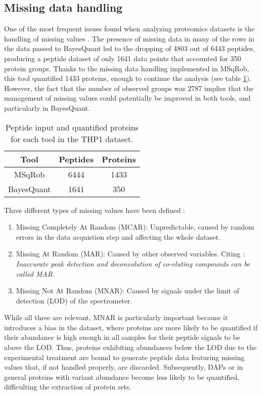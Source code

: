 \subsection{Missing data handling}

One of the most frequent issues found when analyzing proteomics datasets is the handling of missing values \cite{Lazar2016}. The presence of missing data in many of the rows in the data passed to BayesQuant led to the dropping of 4803 out of 6443 peptides, producing a peptide dataset of only 1641 data points that accounted for 350 protein groups. Thanks to the missing data handling implemented in MSqRob, this tool quantified 1433 proteins, enough to continue the analysis (see table \ref{tab:balance}). However, the fact that the number of observed groups was 2787 implies that the management of missing values could potentially be improved in both tools, and particularly in BayesQuant.

\begin{table}[!h]
\centering
\begin{tabular}{|c|c|c|}
\hline 
Tool & Peptides & Proteins \\ 
\hline 
MSqRob & 6444 & 1433 \\ 
\hline 
BayesQuant & 1641 & 350 \\ 
\hline 
\end{tabular} 
\caption{Peptide input and quantified proteins for each tool in the THP1 dataset.}
\label{tab:balance}
\end{table}

Three different types of missing values have been defined \cite{Wei2018}:

\begin{enumerate}

\item Missing Completely At Random (MCAR): Unpredictable, caused by random errors in the data acquistion step and affecting the whole dataset.

\item Missing At Random (MAR): Caused by other observed variables. Citing \cite{Wei2018}: \textit{ Inaccurate peak detection and deconvolution of co-eluting compounds can be called MAR}.

\item Missing Not At Random (\ac{MNAR}): Caused by signals under the limit of detection (\ac{LOD}) of the spectrometer.

\end{enumerate}

While all three are relevant, \ac{MNAR} is particularly important because it introduces a bias in the dataset, where proteins are more likely to be quantified if their abundance is high enough in all samples for their peptide signals to be above the \ac{LOD}. Thus, proteins exhibiting abundances below the \ac{LOD} due to the experimental treatment are bound to generate peptide data featuring missing values that, if not handled properly, are discarded. Subsequently, \ac{DAP}s or in general proteins with variant abundance become less likely to be quantified, difficulting the extraction of protein sets.

